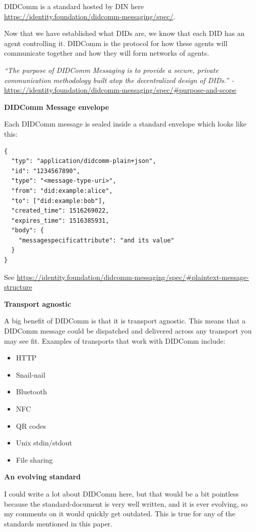 DIDComm is a standard hosted by DIN here
\url{https://identity.foundation/didcomm-messaging/spec/}.

Now that we have established what DIDs are, we know that each DID has an
agent controlling it. DIDComm is the protocol for how these agents will
communicate together and how they will form networks of agents.

\emph{``The purpose of DIDComm Messaging is to provide a secure, private
communication methodology built atop the decentralized design of DIDs.''
-}
\url{https://identity.foundation/didcomm-messaging/spec/\#purpose-and-scope}

\textbf{DIDComm Message envelope}

Each DIDComm message is sealed inside a standard envelope which looks
like this:

\begin{lstlisting}
{
  "typ": "application/didcomm-plain+json",
  "id": "1234567890",
  "type": "<message-type-uri>",
  "from": "did:example:alice",
  "to": ["did:example:bob"],
  "created_time": 1516269022,
  "expires_time": 1516385931,
  "body": {
    "messagespecificattribute": "and its value"
  }
} 
\end{lstlisting}

See
\url{https://identity.foundation/didcomm-messaging/spec/\#plaintext-message-structure}

\textbf{Transport agnostic}

A big benefit of DIDComm is that it is transport agnostic. This means
that a DIDComm message could be dispatched and delivered across any
transport you may see fit. Examples of transports that work with DIDComm
include:

\begin{itemize}
\tightlist
\item
  HTTP
\item
  Snail-nail
\item
  Bluetooth
\item
  NFC
\item
  QR codes
\item
  Unix stdin/stdout
\item
  File sharing
\end{itemize}

\textbf{An evolving standard}

I could write a lot about DIDComm here, but that would be a bit
pointless because the standard-document is very well written, and it is
ever evolving, so my comments on it would quickly get outdated. This is
true for any of the standards mentioned in this paper.

